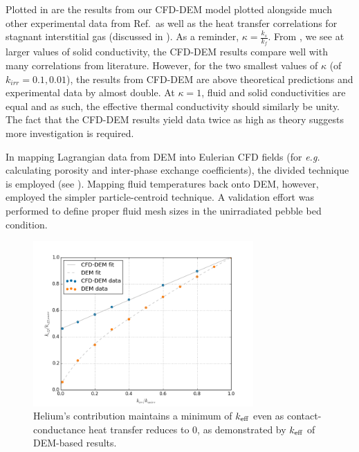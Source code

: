 Plotted in  are the results from our CFD-DEM model plotted alongside much other experimental data from Ref.\cite{VanAntwerpen2010}~as well as the heat transfer correlations for stagnant interstitial gas (discussed in ). As a reminder, $\kappa = \frac{k_s}{k_f}$. From , we see at larger values of solid conductivity, the CFD-DEM results compare well with many correlations from literature. However, for the two smallest values of $\kappa$ (of $k_{irr} = 0.1, 0.01$), the results from CFD-DEM are above theoretical predictions and experimental data by almost double. At $\kappa = 1$, fluid and solid conductivities are equal and as such, the effective thermal conductivity should similarly be unity. The fact that the CFD-DEM results yield data twice as high as theory suggests more investigation is required. 

In mapping Lagrangian data from DEM into Eulerian CFD fields (for \textit{e.g.} calculating porosity and inter-phase exchange coefficients), the divided technique is employed (see ). Mapping fluid temperatures back onto DEM, however, employed the simpler particle-centroid technique. A validation effort was performed to define proper fluid mesh sizes in the unirradiated pebble bed condition.

\begin{figure}[ht]
    \centering
    \includegraphics[width = 0.75\textwidth]{figures/irradiated/keff-plots-cfd-comparison.png}
    \caption{Helium's contribution maintains a minimum of $k_\text{eff}$ even as contact-conductance heat transfer reduces to 0, as demonstrated by $k_\text{eff}$ of DEM-based results.}\label{fig:irrad-keff-cfd-comparison}
\end{figure}

